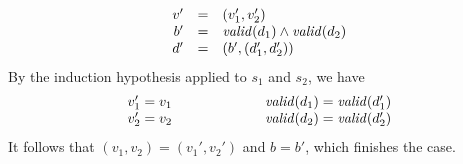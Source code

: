 {\begin{description}
\[\begin{array}{rcl}
v' &=& (v_1',v_2')\\
b' &= & \mathit{valid}(d_1) \wedge \mathit{valid}(d_2)\\
d' &=& (b',(d_1',d_2'))\\
\end{array}
\]
%
By the induction hypothesis applied to $s_1$ and $s_2$, we have 
\[
\begin{array}{l}
v_1' = v_1\\
v_2' = v_2\\
\end{array}\hspace*{2cm}\begin{array}{l}
\mathit{valid}(d_1) = \mathit{valid}(d_1')\\
\mathit{valid}(d_2) = \mathit{valid}(d_2')\\
\end{array}
\]
It follows that $(v_1,v_2) = (v_1',v_2')$ and $b = b'$, which
finishes the case.


\end{description}}
